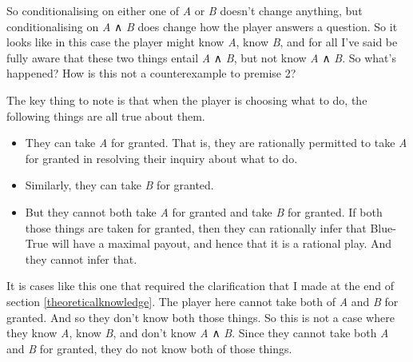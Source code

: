 \documentclass[
  11pt,
]{book}
\providecommand{\tightlist}{%
  \setlength{\itemsep}{0pt}\setlength{\parskip}{0pt}}
\begin{document}
So conditionalising on either one of \emph{A} or \emph{B} doesn't change anything, but conditionalising on \emph{A} ∧ \emph{B} does change how the player answers a question. So it looks like in this case the player might know \emph{A}, know \emph{B}, and for all I've said be fully aware that these two things entail \emph{A} ∧ \emph{B}, but not know \emph{A} ∧ \emph{B}. So what's happened? How is this not a counterexample to premise 2?

The key thing to note is that when the player is choosing what to do, the following things are all true about them.

\begin{itemize}
\tightlist
\item
  They can take \emph{A} for granted. That is, they are rationally permitted to take \emph{A} for granted in resolving their inquiry about what to do.
\item
  Similarly, they can take \emph{B} for granted.
\item
  But they cannot both take \emph{A} for granted and take \emph{B} for granted. If both those things are taken for granted, then they can rationally infer that Blue-True will have a maximal payout, and hence that it is a rational play. And they cannot infer that.
\end{itemize}

It is cases like this one that required the clarification that I made at the end of section \ref{theoreticalknowledge}. The player here cannot take both of \emph{A} and \emph{B} for granted. And so they don't know both those things. So this is not a case where they know \emph{A}, know \emph{B}, and don't know \emph{A} ∧ \emph{B}. Since they cannot take both \emph{A} and \emph{B} for granted, they do not know both of those things.
\end{document}
